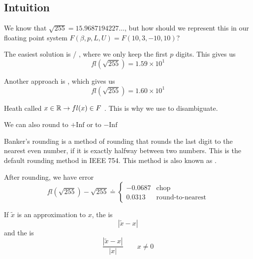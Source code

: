 \subsection{Intuition}

\begin{example}
    We know that \( \sqrt{255} = 15.9687194227\dots \), but how should we represent this in our floating point system \( F(\beta, p, L, U) = F(10, 3, -10, 10) \)?

    The easiest solution is  / , where we only keep the first \( p \) digits. This gives us \[
        fl(\sqrt{255}) = 1.59 \times 10^1
    \]

    Another approach is , which gives us \[
        fl(\sqrt{255}) = 1.60 \times 10^1
    \]
\end{example}

\begin{remark}
    Heath called \( x \in \mathbb{R} \to fl(x) \in F \) . This is why we use  to disambiguate.
\end{remark}

\begin{note}
    We can also round to \( +\text{Inf} \) or to \( -\text{Inf} \)
\end{note}

\begin{note}
    Banker's rounding is a method of rounding that rounds the last digit to the nearest even number, if it is exactly halfway between two numbers. This is the default rounding method in IEEE 754. This method is also known as .
\end{note}

\begin{example}[Cont.]
    After rounding, we have error \[
        fl(\sqrt{255}) -\sqrt{255} \doteq \begin{cases}
            -0.0687 & \text{chop}             \\
            0.0313  & \text{round-to-nearest}
        \end{cases}
    \]
\end{example}

\begin{definition}
    If \( \tilde{x} \) is an approximation to \( x \), the  is \[
        | \tilde{x} - x |
    \] and the  is \[
        \frac{| \tilde{x} - x |}{|x|} \qquad x \neq 0
    \]
\end{definition}


